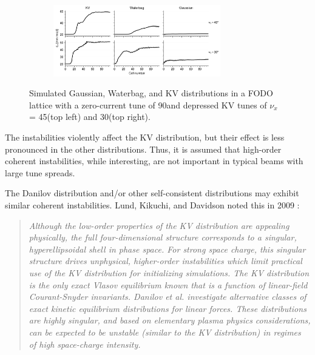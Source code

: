 \begin{figure}[!p]
\begin{subfigure}[b]{0.45\textwidth}
        \label{fig:f2}
    \end{subfigure}
    \vfill
    \begin{subfigure}[b]{\textwidth}
        \centering
        \includegraphics[width=0.8\textwidth]{Images/chapter1/coherent_instability_emittances.png}
        \label{fig:coherent_instabilities_b}
    \end{subfigure}
    \caption{Simulated Gaussian, Waterbag, and KV distributions in a FODO lattice with a zero-current tune of 90\degree and depressed KV tunes of $\nu_x$ = 45\degree (top left) and 30\degree (top right).}
    \label{fig:coherent_instabilities}
\end{figure}
%
The instabilities violently affect the KV distribution, but their effect is less pronounced in the other distributions. Thus, it is assumed that high-order coherent instabilities, while interesting, are not important in typical beams with large tune spreads.

The Danilov distribution and/or other self-consistent distributions may exhibit similar coherent instabilities. Lund, Kikuchi, and Davidson noted this in 2009 \cite{Lund2009}:
\begin{quote}
    \textit{Although the low-order properties of the KV distribution are appealing physically, the full four-dimensional structure corresponds to a singular, hyperellipsoidal shell in phase space. For strong space charge, this singular structure drives unphysical, higher-order instabilities which limit practical use of the KV distribution for initializing simulations. The KV distribution is the only exact Vlasov equilibrium known that is a function of linear-field Courant-Snyder invariants. Danilov et al. \cite{Danilov2003} investigate alternative classes of exact kinetic equilibrium distributions for linear forces. These distributions are highly singular, and based on elementary plasma physics considerations, can be expected to be unstable (similar to the KV distribution) in regimes of high space-charge intensity.}
\end{quote}